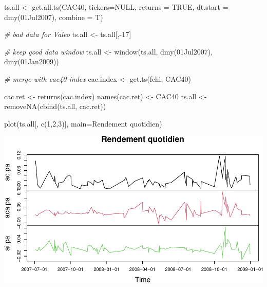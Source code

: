 \documentclass[
]{article}
\newenvironment{Shaded}{\begin{snugshade}}{\end{snugshade}}
\newcommand{\AttributeTok}[1]{\textcolor[rgb]{0.77,0.63,0.00}{#1}}
\newcommand{\CommentTok}[1]{\textcolor[rgb]{0.56,0.35,0.01}{\textit{#1}}}
\newcommand{\ConstantTok}[1]{\textcolor[rgb]{0.00,0.00,0.00}{#1}}
\newcommand{\DecValTok}[1]{\textcolor[rgb]{0.00,0.00,0.81}{#1}}
\newcommand{\FunctionTok}[1]{\textcolor[rgb]{0.00,0.00,0.00}{#1}}
\newcommand{\NormalTok}[1]{#1}
\newcommand{\OtherTok}[1]{\textcolor[rgb]{0.56,0.35,0.01}{#1}}
\newcommand{\SpecialCharTok}[1]{\textcolor[rgb]{0.00,0.00,0.00}{#1}}
\newcommand{\StringTok}[1]{\textcolor[rgb]{0.31,0.60,0.02}{#1}}
\begin{document}
\begin{Shaded}
\begin{Highlighting}[]
\NormalTok{ts.all }\OtherTok{\textless{}{-}} \FunctionTok{get.all.ts}\NormalTok{(}\StringTok{\textquotesingle{}CAC40\textquotesingle{}}\NormalTok{, }\AttributeTok{tickers=}\ConstantTok{NULL}\NormalTok{, }\AttributeTok{returns =} \ConstantTok{TRUE}\NormalTok{,}
  \AttributeTok{dt.start =} \FunctionTok{dmy}\NormalTok{(}\StringTok{\textquotesingle{}01Jul2007\textquotesingle{}}\NormalTok{), }\AttributeTok{combine =}\NormalTok{ T)}

\CommentTok{\# bad data for Valeo}
\NormalTok{ts.all }\OtherTok{\textless{}{-}}\NormalTok{ ts.all[,}\SpecialCharTok{{-}}\DecValTok{17}\NormalTok{]}

\CommentTok{\# keep good data window}
\NormalTok{ts.all }\OtherTok{\textless{}{-}} \FunctionTok{window}\NormalTok{(ts.all, }\FunctionTok{dmy}\NormalTok{(}\StringTok{\textquotesingle{}01Jul2007\textquotesingle{}}\NormalTok{), }
                 \FunctionTok{dmy}\NormalTok{(}\StringTok{\textquotesingle{}01Jan2009\textquotesingle{}}\NormalTok{))}

\CommentTok{\# merge with cac40 index}
\NormalTok{cac.index }\OtherTok{\textless{}{-}} \FunctionTok{get.ts}\NormalTok{(}\StringTok{\textquotesingle{}fchi\textquotesingle{}}\NormalTok{, }\StringTok{\textquotesingle{}CAC40\textquotesingle{}}\NormalTok{)}

\NormalTok{cac.ret }\OtherTok{\textless{}{-}} \FunctionTok{returns}\NormalTok{(cac.index)}
\FunctionTok{names}\NormalTok{(cac.ret) }\OtherTok{\textless{}{-}} \StringTok{\textquotesingle{}CAC40\textquotesingle{}}
\NormalTok{ts.all }\OtherTok{\textless{}{-}} \FunctionTok{removeNA}\NormalTok{(}\FunctionTok{cbind}\NormalTok{(ts.all, cac.ret))}
\end{Highlighting}
\end{Shaded}

\begin{Shaded}
\begin{Highlighting}[]
\FunctionTok{plot}\NormalTok{(ts.all[, }\FunctionTok{c}\NormalTok{(}\DecValTok{1}\NormalTok{,}\DecValTok{2}\NormalTok{,}\DecValTok{3}\NormalTok{)], }\AttributeTok{main=}\StringTok{\textquotesingle{}Rendement quotidien\textquotesingle{}}\NormalTok{)}
\end{Highlighting}
\end{Shaded}

\includegraphics{TP-1_files/figure-latex/plot-cac-1-1.pdf}
\end{document}
